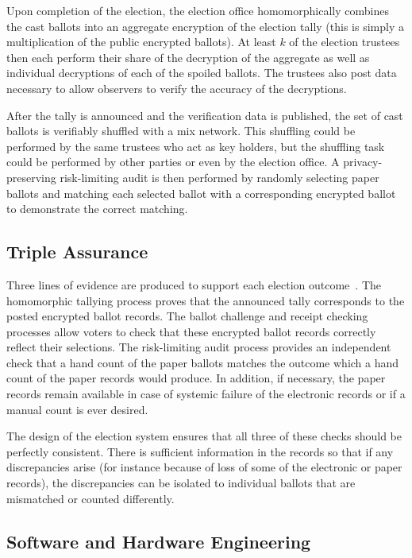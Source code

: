 Upon completion of the election, the election office homomorphically combines the cast ballots into an aggregate encryption of the election tally (this is simply a multiplication of the public encrypted ballots).  At least $k$ of the election trustees then each perform their share of the decryption of the aggregate as well as individual decryptions of each of the spoiled ballots.  The trustees also post data necessary to allow observers to verify the accuracy of the decryptions.

After the tally is announced and the verification data is published, the set of cast ballots is verifiably shuffled with a mix network.  This shuffling could be performed by the same trustees who act as key holders, but the shuffling task could be performed by other parties or even by the election office.  A privacy-preserving risk-limiting audit is then performed by randomly selecting paper ballots and matching each selected ballot with a corresponding encrypted ballot to demonstrate the correct matching.

\subsection{Triple Assurance}

Three lines of evidence are produced to support each election outcome~\cite{starkWagner12}.  The homomorphic tallying process proves that the announced tally corresponds to the posted encrypted ballot records.  The ballot challenge and receipt checking processes allow voters to check that these encrypted ballot records correctly reflect their selections.  The risk-limiting audit process provides an independent check that a hand count of the paper ballots matches the outcome which a hand count of the paper records would produce.  In addition, if necessary, the paper records remain available in case of systemic failure of the electronic records or if a manual count is ever desired.

The design of the election system ensures that all three of these checks should be perfectly consistent.  There is sufficient information in the records so that if any discrepancies arise (for instance because of loss of some of the electronic or paper records), the discrepancies can be isolated to individual ballots that are mismatched or counted differently.

\subsection{Software and Hardware Engineering}

